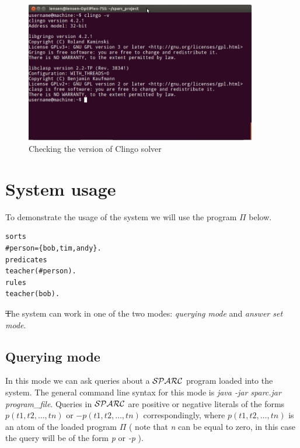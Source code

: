 \documentclass[12pt, letterpaper]{article}
\begin{document}
\begin{figure}[p]
\centering
\includegraphics[width=0.9\textwidth]{clingo_version.jpg}
\caption{Checking the version of Clingo solver}
\label{fig:clingo_solver_check}
\end{figure}

\section{System usage}

To demonstrate the usage of the system we will use the program $\Pi$ below.
\begin{verbatim}
sorts
#person={bob,tim,andy}.
predicates
teacher(#person).
rules
teacher(bob).
\end{verbatim}

\st
The system can work in one of the  two modes: \textit{querying mode} and \textit{answer set mode}.

\subsection{Querying mode}

In this mode we can ask queries about a ${\cal SPARC}$ program loaded into the system.
The general command line syntax for this mode is \textit{java -jar sparc.jar program\_file}.
Queries in ${\cal SPARC}$ are positive or negative literals of the forms $p(t1,t2,\dots,tn)$ or
$-p(t1,t2,\dots,tn)$ correspondingly, where $p(t1,t2,\dots,tn)$  is an atom of the loaded program $\Pi$ 
( note that \textit{n} can be equal to zero, in this case the query will be of the form \textit{p} or \textit{-p}  ).
\end{document}
